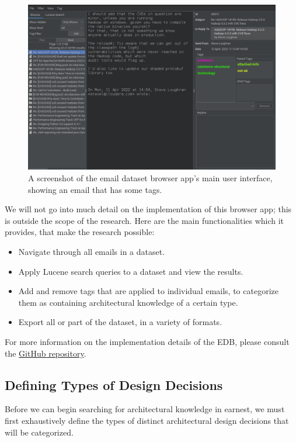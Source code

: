 \documentclass[a4paper, 12pt]{article}
\begin{document}
		\begin{figure}[H]
			\label{fig:edb-screenshot}
			\centering
			\includegraphics[width=\textwidth]{img/edb-screenshot.png}
			\caption{A screenshot of the email dataset browser app's main user interface, showing an email that has some tags.}
		\end{figure}
	
		We will not go into much detail on the implementation of this browser app; this is outside the scope of the research. Here are the main functionalities which it provides, that make the research possible:
		
		\begin{itemize}
			\item Navigate through all emails in a dataset.
			\item Apply Lucene search queries to a dataset and view the results.
			\item Add and remove tags that are applied to individual emails, to categorize them as containing architectural knowledge of a certain type.
			\item Export all or part of the dataset, in a variety of formats.
		\end{itemize}
	
		For more information on the implementation details of the EDB, please consult the \href{https://github.com/ArchitecturalKnowledgeAnalysis/EmailDatasetBrowser}{GitHub repository}.
	
	\subsection{Defining Types of Design Decisions}
		\label{sec:design-decisions}
		Before we can begin searching for architectural knowledge in earnest, we must first exhaustively define the types of distinct architectural design decisions that will be categorized.
		
\end{document}
